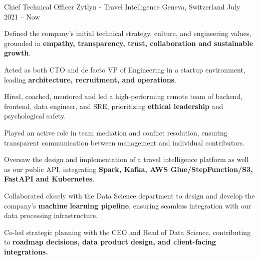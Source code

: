 

\begin{cventries}

\cventry
  {Chief Technical Officer} %
  {Zytlyn - Travel Intelligence} %
  {Geneva, Switzerland} %
  {July 2021 – Now} %
  {
    \begin{cvitems} %
      \item {Defined the company's initial technical strategy, culture, and engineering values, grounded in \textbf{empathy, transparency, trust, collaboration and sustainable growth}.}
      \item {Acted as both CTO and de facto VP of Engineering in a startup environment, leading \textbf{architecture, recruitment, and operations}.}
      \item {Hired, coached, mentored and led a high-performing remote team of backend, frontend, data engineer, and SRE, prioritizing \textbf{ethical leadership} and psychological safety.}
      \item {Played an active role in team mediation and conflict resolution, ensuring transparent communication between management and individual contributors.}
      \item {Oversaw the design and implementation of a travel intelligence platform as well as our public API, integrating \textbf{Spark, Kafka, AWS Glue/StepFunction/S3, FastAPI and Kubernetes}.}
      \item {Collaborated closely with the Data Science department to design and develop the company's \textbf{machine learning pipeline}, ensuring seamless integration with our data processing infrastructure.}
      \item {Co-led strategic planning with the CEO and Head of Data Science, contributing to \textbf{roadmap decisions, data product design, and client-facing integrations.}}
    \end{cvitems}
  }


\end{cventries}
